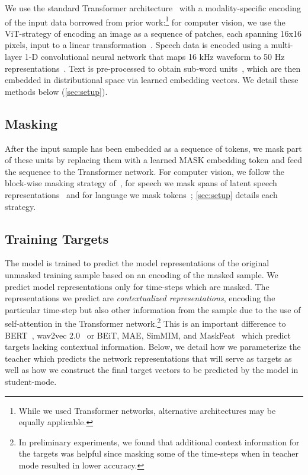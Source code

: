 \documentclass[nohyperref]{article}
\theoremstyle{plain}
\theoremstyle{definition}
\theoremstyle{remark}
\begin{document}
We use the standard Transformer architecture~\citep{vaswani2017transformer} with a modality-specific encoding of the input data borrowed from prior work:\footnote{While we used Transformer networks, alternative architectures may be equally applicable.}
for computer vision, we use the ViT-strategy of encoding an image as a sequence of patches, each spanning 16x16 pixels, input to a linear transformation~\citep{dosovitskiy2020vit,bao2021beit}.
Speech data is encoded using a multi-layer 1-D convolutional neural network that maps 16 kHz waveform to 50 Hz representations~\citep{baevski2020wav}.
Text is pre-processed to obtain sub-word units~\citep{sennrich2016bpe,devlin2018bert}, which are then embedded in distributional space via learned embedding vectors.
We detail these methods below (\textsection\ref{sec:setup}).


\subsection{Masking}

After the input sample has been embedded as a sequence of tokens, we mask part of these units by replacing them with a learned MASK embedding token and feed the sequence to the Transformer network.
For computer vision, we follow the block-wise masking strategy of~\citet{bao2021beit}, for speech we mask spans of latent speech representations~\citep{baevski2020wav} and for language we mask tokens~\citep{devlin2018bert}; \textsection\ref{sec:setup} details each strategy.



\subsection{Training Targets}
\label{sec:method_targets}

The model is trained to predict the model representations of the original unmasked training sample based on an encoding of the masked sample.
We predict model representations only for time-steps which are masked.
The representations we predict are \emph{contextualized representations}, encoding the particular time-step but also other information from the sample due to the use of self-attention in the Transformer network.\footnote{
In preliminary experiments, we found that additional context information for the targets was helpful since masking some of the time-steps when in teacher mode resulted in lower accuracy.
}
This is an important difference to BERT~\citep{devlin2018bert}, wav2vec 2.0~\citep{baevski2020wav} or BEiT, MAE, SimMIM, and MaskFeat~\citep{bao2021beit,he2021mae,xie2021simmim,wei2021masked} which predict targets lacking contextual information.
Below, we detail how we parameterize the teacher which predicts the network representations that will serve as targets as well as how we construct the final target vectors to be predicted by the model in student-mode.
\end{document}
